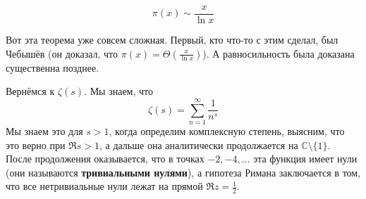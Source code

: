\documentclass{article}
\begin{document}
    \begin{theorem}
        $$
        \pi(x)\sim\frac x{\ln x}
        $$
    \end{theorem}
    \begin{remark}
        Вот эта теорема уже совсем сложная. Первый, кто что-то с этим сделал, был Чебышёв (он доказал, что $\pi(x)=\Theta\left(\frac x{\ln x}\right)$). А равносильность была доказана существенна позднее.
    \end{remark}
    \begin{remark}
        Вернёмся к $\zeta(s)$. Мы знаем, что
        $$
        \zeta(s)=\sum\limits_{n=1}^\infty\frac1{n^s}
        $$
        Мы знаем это для $s>1$, когда определим комплексную степень, выясним, что это верно при $\Re s>1$, а дальше она аналитически продолжается на $\mathbb C\setminus\{1\}$.\\
        После продолжения оказывается, что в точках $-2,-4,\ldots$ эта функция имеет нули (они называются \textbf{тривиальными нулями}), а гипотеза Римана заключается в том, что все нетривиальные нули лежат на прямой $\Re z=\frac12$.
    \end{remark}
\end{document}

